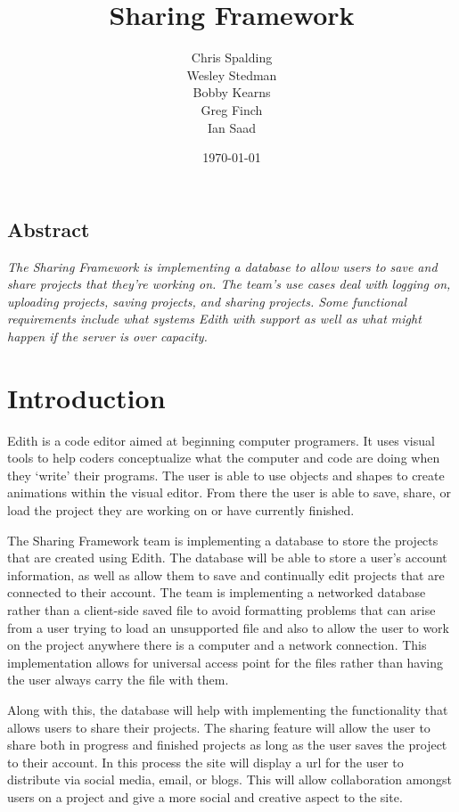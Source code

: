 \documentclass[12pt]{article}
\title{\Huge{Sharing Framework}}
\author{Chris Spalding\\ Wesley Stedman\\ Bobby Kearns\\ Greg Finch\\ Ian Saad}
\date{\today}
\begin{document}
\begin{titlepage}
\maketitle
\end{titlepage}
\maketitle

\subsection{Abstract}
\textit{The Sharing Framework is implementing a database to allow users to save and share projects that they're working on. The team's use cases deal with logging on, uploading projects, saving projects, and sharing projects. Some functional requirements include what systems Edith with support as well as what might happen if the server is over capacity.}

\section{Introduction}
Edith is a code editor aimed at beginning computer programers. It uses visual tools to help coders conceptualize what the computer and code are doing when they `write' their programs. The user is able to use objects and shapes to create animations within the visual editor. From there the user is able to save, share, or load the project they are working on or have currently finished.

The Sharing Framework team is implementing a database to store the projects that are created using Edith. The database will be able to store a user's account information, as well as allow them to save and continually edit projects that are connected to their account. The team is implementing a networked database rather than a client-side saved file to avoid formatting problems that can arise from a user trying to load an unsupported file and also to allow the user to work on the project anywhere there is a computer and a network connection. This implementation allows for universal access point for the files rather than having the user always carry the file with them. 

Along with this, the database will help with implementing the functionality that allows users to share their projects. The sharing feature will allow the user to share both in progress and finished projects as long as the user saves the project to their account. In this process the site will display a url for the user to distribute via social media, email, or blogs. This will allow collaboration amongst users on a project and give a more social and creative aspect to the site. 
\end{document}

